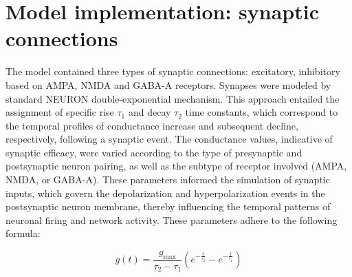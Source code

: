 \section{Model implementation: synaptic connections}
The model contained three types of synaptic connections: excitatory, inhibitory
based on AMPA, NMDA and GABA-A receptors. Synapses were modeled by standard
NEURON double-exponential mechanism. This approach entailed the assignment of
specific rise \(\tau_1\) and decay \(\tau_2\) time constants, which correspond
to the temporal profiles of conductance increase and subsequent decline,
respectively, following a synaptic event. The conductance values, indicative of
synaptic efficacy, were varied according to the type of presynaptic and
postsynaptic neuron pairing, as well as the subtype of receptor involved (AMPA,
NMDA, or GABA-A). These parameters informed the simulation of synaptic inputs,
which govern the depolarization and hyperpolarization events in the
postsynaptic neuron membrane, thereby influencing the temporal patterns of
neuronal firing and network activity. These parameters adhere to the following formula:

\begin{equation}
    g(t) = \frac{g_{\text{max}}}{\tau_2 - \tau_1} \left( e^{-\frac{t}{\tau_2}} - e^{-\frac{t}{\tau_1}} \right)
\end{equation}

